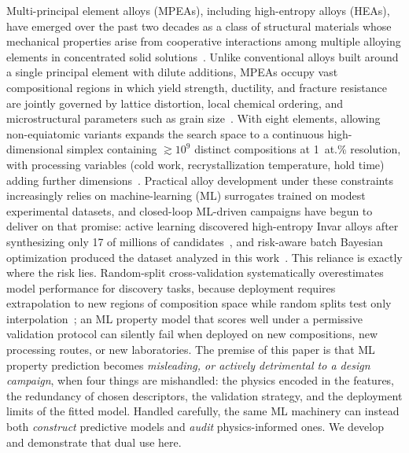 \documentclass[5p,times,twocolumn]{elsarticle}
\begin{document}
Multi-principal element alloys (MPEAs), including high-entropy alloys (HEAs), have emerged over the past two decades as a class of structural materials whose mechanical properties arise from cooperative interactions among multiple alloying elements in concentrated solid solutions~\cite{Cantor2004,Yeh2004,George2019}. Unlike conventional alloys built around a single principal element with dilute additions, MPEAs occupy vast compositional regions in which yield strength, ductility, and fracture resistance are jointly governed by lattice distortion, local chemical ordering, and microstructural parameters such as grain size~\cite{Miracle2017}. With eight elements, allowing non-equiatomic variants expands the search space to a continuous high-dimensional simplex containing $\gtrsim 10^9$ distinct compositions at 1~at.\% resolution, with processing variables (cold work, recrystallization temperature, hold time) adding further dimensions~\cite{Senkov2018}. Practical alloy development under these constraints increasingly relies on machine-learning (ML) surrogates trained on modest experimental datasets, and closed-loop ML-driven campaigns have begun to deliver on that promise: active learning discovered high-entropy Invar alloys after synthesizing only 17 of millions of candidates~\cite{Rao2022}, and risk-aware batch Bayesian optimization produced the dataset analyzed in this work~\cite{Mulukutla2024BIRDSHOT,Mulukutla2026BRAVE}. This reliance is exactly where the risk lies. Random-split cross-validation systematically overestimates model performance for discovery tasks, because deployment requires extrapolation to new regions of composition space while random splits test only interpolation~\cite{Meredig2018}; an ML property model that scores well under a permissive validation protocol can silently fail when deployed on new compositions, new processing routes, or new laboratories. The premise of this paper is that ML property prediction becomes \emph{misleading, or actively detrimental to a design campaign}, when four things are mishandled: the physics encoded in the features, the redundancy of chosen descriptors, the validation strategy, and the deployment limits of the fitted model. Handled carefully, the same ML machinery can instead both \emph{construct} predictive models and \emph{audit} physics-informed ones. We develop and demonstrate that dual use here.
\end{document}
